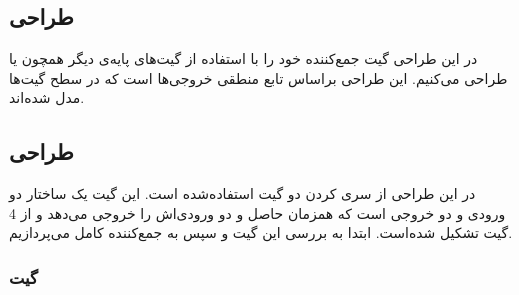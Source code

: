 
\newpage

\subsection{
    طراحی
}
در این طراحی گیت جمع‌کننده خود را با استفاده از گیت‌های پایه‌ی دیگر همچون  یا  طراحی می‌کنیم.
این طراحی براساس تابع منطقی خروجی‌ها است که در سطح گیت‌ها مدل شده‌اند.




\newpage

\subsection{
    طراحی
}
در این طراحی از سری کردن دو گیت  استفاده‌شده است.
این گیت یک ساختار دو ورودی و دو خروجی است که همزمان حاصل  و   دو ورودی‌اش را خروجی می‌دهد و از 4 گیت  تشکیل شده‌است.
ابتدا به بررسی این گیت و سپس به جمع‌کننده کامل می‌پردازیم.

\subsubsection*{
    گیت
}



